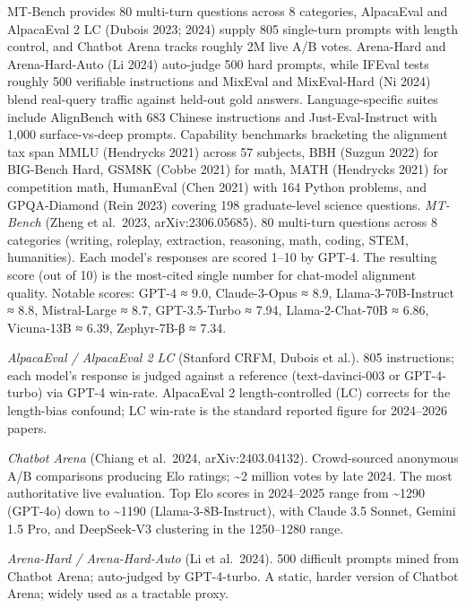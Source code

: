 \documentclass{article}
\begin{document}
MT-Bench \citep{zheng20232023} provides 80 multi-turn questions across 8 categories, AlpacaEval and AlpacaEval 2 LC (Dubois 2023; 2024) supply 805 single-turn prompts with length control, and Chatbot Arena \citep{chiang2024chatbotarenaanopen} tracks roughly 2M live A/B votes. Arena-Hard and Arena-Hard-Auto (Li 2024) auto-judge 500 hard prompts, while IFEval \citep{zhou2024wpoenhancingrlhfwi} tests roughly 500 verifiable instructions and MixEval and MixEval-Hard (Ni 2024) blend real-query traffic against held-out gold answers. Language-specific suites include AlignBench \citep{liu2023statisticalrejecti} with 683 Chinese instructions and Just-Eval-Instruct \citep{lin2022truthfulqameasurin} with 1,000 surface-vs-deep prompts. Capability benchmarks bracketing the alignment tax span MMLU (Hendrycks 2021) across 57 subjects, BBH (Suzgun 2022) for BIG-Bench Hard, GSM8K (Cobbe 2021) for math, MATH (Hendrycks 2021) for competition math, HumanEval (Chen 2021) with 164 Python problems, and GPQA-Diamond (Rein 2023) covering 198 graduate-level science questions. \emph{MT-Bench} (Zheng et al.~2023, arXiv:2306.05685). 80 multi-turn questions across 8 categories (writing, roleplay, extraction, reasoning, math, coding, STEM, humanities). Each model's responses are scored 1--10 by GPT-4. The resulting score (out of 10) is the most-cited single number for chat-model alignment quality. Notable scores: GPT-4 ≈ 9.0, Claude-3-Opus ≈ 8.9, Llama-3-70B-Instruct ≈ 8.8, Mistral-Large ≈ 8.7, GPT-3.5-Turbo ≈ 7.94, Llama-2-Chat-70B ≈ 6.86, Vicuna-13B ≈ 6.39, Zephyr-7B-β ≈ 7.34.

\emph{AlpacaEval / AlpacaEval 2 LC} (Stanford CRFM, Dubois et al.). 805 instructions; each model's response is judged against a reference (text-davinci-003 or GPT-4-turbo) via GPT-4 win-rate. AlpacaEval 2 length-controlled (LC) corrects for the length-bias confound; LC win-rate is the standard reported figure for 2024--2026 papers.

\emph{Chatbot Arena} (Chiang et al.~2024, arXiv:2403.04132). Crowd-sourced anonymous A/B comparisons producing Elo ratings; \textasciitilde2 million votes by late 2024. The most authoritative live evaluation. Top Elo scores in 2024--2025 range from \textasciitilde1290 (GPT-4o) down to \textasciitilde1190 (Llama-3-8B-Instruct), with Claude 3.5 Sonnet, Gemini 1.5 Pro, and DeepSeek-V3 clustering in the 1250--1280 range.

\emph{Arena-Hard / Arena-Hard-Auto} (Li et al.~2024). 500 difficult prompts mined from Chatbot Arena; auto-judged by GPT-4-turbo. A static, harder version of Chatbot Arena; widely used as a tractable proxy.
\end{document}
